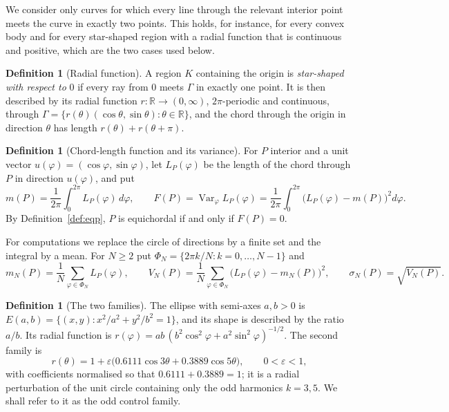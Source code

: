 \documentclass[11pt]{article}
\newcommand{\Var}{\operatorname{Var}}
\newcommand{\R}{\mathbb{R}}
\theoremstyle{definition}
\newtheorem{definition}[theorem]{Definition}
\theoremstyle{remark}
\begin{document}
We consider only curves for which every line through the relevant interior point meets the curve in exactly two
points. This holds, for instance, for every convex body and for every star-shaped region with a radial function
that is continuous and positive, which are the two cases used below.

\begin{definition}[Radial function]\label{def:radial}
A region $K$ containing the origin is \emph{star-shaped with respect to} $0$ if every ray from $0$ meets $\Gamma$ in
exactly one point. It is then described by its radial function $r:\R\to(0,\infty)$, $2\pi$-periodic and continuous,
through $\Gamma=\{r(\theta)(\cos\theta,\sin\theta):\theta\in\R\}$, and the chord through the origin in direction
$\theta$ has length $r(\theta)+r(\theta+\pi)$.
\end{definition}

\begin{definition}[Chord-length function and its variance]\label{def:var}
For $P$ interior and a unit vector $u(\varphi)=(\cos\varphi,\sin\varphi)$, let $L_P(\varphi)$ be the length of the
chord through $P$ in direction $u(\varphi)$, and put
\[
m(P)=\frac{1}{2\pi}\int_0^{2\pi}L_P(\varphi)\,d\varphi,\qquad
F(P)=\Var_\varphi L_P(\varphi)=\frac{1}{2\pi}\int_0^{2\pi}\bigl(L_P(\varphi)-m(P)\bigr)^2d\varphi .
\]
By Definition~\ref{def:eqp}, $P$ is equichordal if and only if $F(P)=0$.
\end{definition}

For computations we replace the circle of directions by a finite set and the integral by a mean. For $N\ge 2$ put
$\Phi_N=\{2\pi k/N:k=0,\dots,N-1\}$ and
\[
m_N(P)=\frac1N\sum_{\varphi\in\Phi_N}L_P(\varphi),\qquad
V_N(P)=\frac1N\sum_{\varphi\in\Phi_N}\bigl(L_P(\varphi)-m_N(P)\bigr)^2,\qquad \sigma_N(P)=\sqrt{V_N(P)}.
\]

\begin{definition}[The two families]\label{def:families}
The ellipse with semi-axes $a,b>0$ is $E(a,b)=\{(x,y):x^2/a^2+y^2/b^2=1\}$, and its shape is described by the
ratio $a/b$. Its radial function is $r(\varphi)=ab\,(b^2\cos^2\varphi+a^2\sin^2\varphi)^{-1/2}$. The second family is
\[
r(\theta)=1+\varepsilon\bigl(0.6111\cos 3\theta+0.3889\cos 5\theta\bigr),\qquad 0<\varepsilon<1,
\]
with coefficients normalised so that $0.6111+0.3889=1$; it is a radial perturbation of the unit circle containing
only the odd harmonics $k=3,5$. We shall refer to it as the odd control family.
\end{definition}
\end{document}
